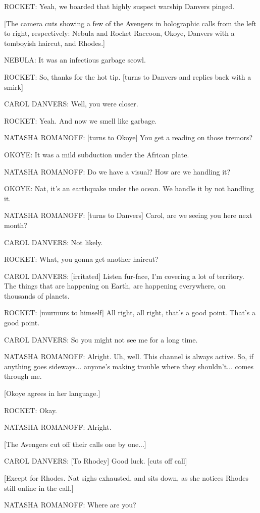 ROCKET: Yeah, we boarded that highly suspect warship Danvers pinged.

[The camera cuts showing a few of the Avengers in holographic calls from the left to right, respectively: Nebula and Rocket Raccoon, Okoye, Danvers with a tomboyish haircut, and Rhodes.]

NEBULA: It was an infectious garbage scowl.

ROCKET: So, thanks for the hot tip. [turns to Danvers and replies back with a smirk]

CAROL DANVERS: Well, you were closer.

ROCKET: Yeah. And now we smell like garbage.

NATASHA ROMANOFF: [turns to Okoye] You get a reading on those tremors?

OKOYE: It was a mild subduction under the African plate.

NATASHA ROMANOFF: Do we have a visual? How are we handling it?

OKOYE: Nat, it's an earthquake under the ocean. We handle it by not handling it.

NATASHA ROMANOFF: [turns to Danvers] Carol, are we seeing you here next month?

CAROL DANVERS: Not likely.

ROCKET: What, you gonna get another haircut?

CAROL DANVERS: [irritated] Listen fur-face, I'm covering a lot of territory. The things that are happening on Earth, are happening everywhere, on thousands of planets.

ROCKET: [murmurs to himself] All right, all right, that's a good point. That's a good point.

CAROL DANVERS: So you might not see me for a long time.

NATASHA ROMANOFF: Alright. Uh, well. This channel is always active. So, if anything goes sideways... anyone's making trouble where they shouldn't... comes through me.

[Okoye agrees in her language.]

ROCKET: Okay.

NATASHA ROMANOFF: Alright.

[The Avengers cut off their calls one by one...]

CAROL DANVERS: [To Rhodey] Good luck. [cuts off call]

[Except for Rhodes. Nat sighs exhausted, and sits down, as she notices Rhodes still online in the call.]

NATASHA ROMANOFF: Where are you?

